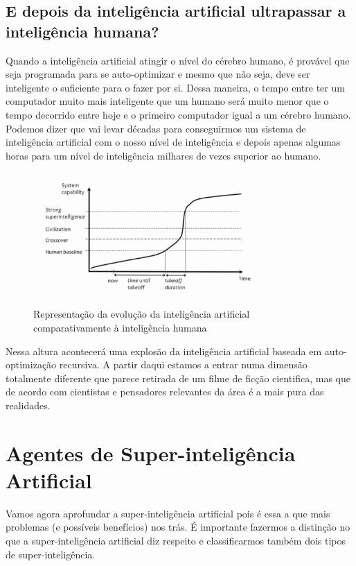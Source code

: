 \documentclass[runningheads,a4paper]{llncs}
\begin{document}
\subsection*{E depois da inteligência artificial ultrapassar a inteligência humana?}

Quando a inteligência artificial atingir o nível do cérebro humano, é provável que seja programada para se auto-optimizar e mesmo que não seja, deve ser inteligente o suficiente para o fazer por si. Dessa maneira, o tempo entre ter um computador muito mais inteligente que um humano será muito menor que o tempo decorrido entre hoje e o primeiro computador igual a um cérebro humano. Podemos dizer que vai levar décadas para conseguirmos um sistema de inteligência artificial com o nosso nível de inteligência e depois apenas algumas horas para um nível de inteligência milhares de vezes superior ao humano.

\begin{figure}[ht!]
  \centering
  \includegraphics[width=90mm]{plot2.png}
  \caption{Representação da evolução da inteligência artificial comparativamente à inteligência humana\label{overflow}}
\end{figure}

Nessa altura acontecerá uma explosão da inteligência artificial baseada em auto-optimização recursiva. A partir daqui estamos a entrar numa dimensão totalmente diferente que parece retirada de um filme de ficção cientifica, mas que de acordo com cientistas e pensadores relevantes da área é a mais pura das realidades.


\section{Agentes de Super-inteligência Artificial}

Vamos agora aprofundar a super-inteligência artificial pois é essa a que mais problemas (e possíveis benefícios) nos trás. É importante fazermos a distinção no que a super-inteligência artificial diz respeito e classificarmos também dois tipos de super-inteligência.
\end{document}

